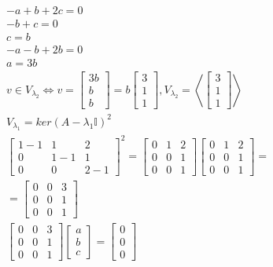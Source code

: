 \documentclass[../main.tex]{subfiles}
\begin{document}
\begin{przyklad}
\begin{align*}
        &-a+b+2c = 0\\
        &-b+c = 0\\
        &c=b\\
        &-a-b+2b=0\\
        &a=3b\\
    &v\in V_{\lambda_2}\iff v = \begin{bmatrix} 3b\\b\\b \end{bmatrix} = b\begin{bmatrix} 3\\1\\1 \end{bmatrix} , V_{\lambda_2} = \left< \begin{bmatrix} 3\\1\\1 \end{bmatrix}  \right>\\
        &V_{\lambda_1} = ker(A-\lambda_1\mathbb{I})^2\\
        &\begin{bmatrix} 1-1&1&2\\0&1-1&1\\0&0&2-1 \end{bmatrix} ^2 = \begin{bmatrix} 0&1&2\\0&0&1\\0&0&1 \end{bmatrix} \begin{bmatrix} 0&1&2\\0&0&1\\0&0&1 \end{bmatrix} = \\
        &=\begin{bmatrix} 0&0&3\\0&0&1\\0&0&1 \end{bmatrix}\\
        &\begin{bmatrix} 0&0&3\\0&0&1\\0&0&1 \end{bmatrix} \begin{bmatrix} a\\b\\c \end{bmatrix} = \begin{bmatrix} 0\\0\\0 \end{bmatrix}\\

\end{align*}
\end{przyklad}
\end{document}

